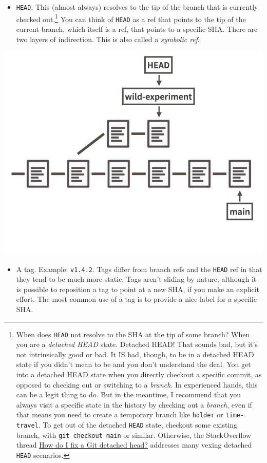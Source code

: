 \documentclass[
]{book}
\providecommand{\tightlist}{%
  \setlength{\itemsep}{0pt}\setlength{\parskip}{0pt}}
\begin{document}
\begin{itemize}
\tightlist
\item
  \texttt{HEAD}.
  This (almost always) resolves to the tip of the branch that is currently
  checked out.\footnote{When does \texttt{HEAD} not resolve to the SHA at the tip of some branch?
    When you are a \emph{detached HEAD} state.
    Detached HEAD!
    That sounds bad, but it's not intrinsically good or bad.
    It IS bad, though, to be in a detached HEAD state if you didn't mean to be and you don't understand the deal.
    You get into a detached HEAD state when you directly checkout a specific commit, as opposed to checking out or switching to a \emph{branch}.
    In experienced hands, this can be a legit thing to do.
    But in the meantime, I recommend that you always visit a specific state in the history by checking out a \emph{branch}, even if that means you need to create a temporary branch like \texttt{holder} or \texttt{time-travel}.
    To get out of the detached \texttt{HEAD} state, checkout some existing branch, with \texttt{git\ checkout\ main} or similar.
    Otherwise, the StackOverflow thread \href{https://stackoverflow.com/q/10228760}{How do I fix a Git detached head?} addresses many vexing detached \texttt{HEAD} scenarios.}
  You can think of \texttt{HEAD} as a ref that points to the tip of the current branch,
  which itself is a ref, that points to a specific SHA.
  There are two layers of indirection.
  This is also called a \emph{symbolic ref}.
\end{itemize}

\begin{center}\includegraphics[width=0.6\linewidth]{img/refs-branches-and-HEAD-1} \end{center}

\begin{itemize}
\tightlist
\item
  A tag.
  Example: \texttt{v1.4.2}.
  Tags differ from branch refs and the \texttt{HEAD} ref in that they tend to be much
  more static.
  Tags aren't sliding by nature, although it is possible to reposition a tag to
  point at a new SHA, if you make an explicit effort.
  The most common use of a tag is to provide a nice label for a specific SHA.
\end{itemize}
\end{document}
